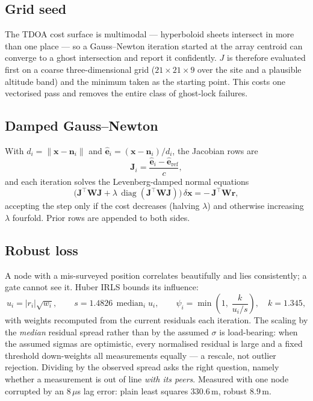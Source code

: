 \documentclass[11pt,a4paper]{article}
\newcommand{\uvec}[1]{\hat{\mathbf{#1}}}
\DeclareMathOperator{\median}{median}
\DeclareMathOperator{\diag}{diag}
\begin{document}
\subsection{Grid seed}

The TDOA cost surface is multimodal --- hyperboloid sheets intersect in more
than one place --- so a Gauss--Newton iteration started at the array
centroid can converge to a ghost intersection and report it confidently.
$J$ is therefore evaluated first on a coarse three-dimensional grid
($21\times21\times9$ over the site and a plausible altitude band) and the
minimum taken as the starting point. This costs one vectorised pass and
removes the entire class of ghost-lock failures.

\subsection{Damped Gauss--Newton}

With $d_i=\lVert\mathbf{x}-\mathbf{n}_i\rVert$ and
$\uvec{e}_i=(\mathbf{x}-\mathbf{n}_i)/d_i$, the Jacobian rows are
\begin{equation}
  \mathbf{J}_i = \frac{\uvec{e}_i-\uvec{e}_{\text{ref}}}{c},
\end{equation}
and each iteration solves the Levenberg-damped normal equations
\begin{equation}
  \bigl(\mathbf{J}^\top\mathbf{W}\mathbf{J}
        + \lambda\,\diag(\mathbf{J}^\top\mathbf{W}\mathbf{J})\bigr)\,
  \delta\mathbf{x} = -\,\mathbf{J}^\top\mathbf{W}\mathbf{r},
\end{equation}
accepting the step only if the cost decreases (halving $\lambda$) and
otherwise increasing $\lambda$ fourfold. Prior rows are appended to both
sides.

\subsection{Robust loss}

A node with a mis-surveyed position correlates beautifully and lies
consistently; a gate cannot see it. Huber IRLS bounds its influence:
\begin{equation}
  u_i = |r_i|\sqrt{w_i},\qquad
  s = 1.4826\,\median_i u_i, \qquad
  \psi_i = \min\!\left(1,\; \frac{k}{u_i/s}\right),\quad k=1.345,
\end{equation}
with weights recomputed from the current residuals each iteration. The
scaling by the \emph{median} residual spread rather than by the assumed
$\sigma$ is load-bearing: when the assumed sigmas are optimistic, every
normalised residual is large and a fixed threshold down-weights all
measurements equally --- a rescale, not outlier rejection. Dividing by the
observed spread asks the right question, namely whether a measurement is out
of line \emph{with its peers}. Measured with one node corrupted by an
$8\,\mu$s lag error: plain least squares $330.6$\,m, robust $8.9$\,m.
\end{document}
